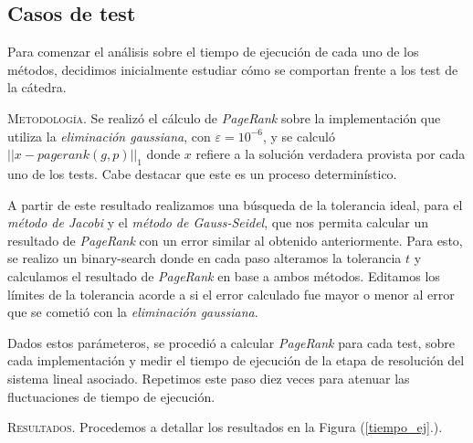 \subsection{Casos de test}

Para comenzar el análisis sobre el tiempo de ejecución de cada uno de los métodos, decidimos inicialmente estudiar cómo se comportan frente a los test de la cátedra. %

\vspace{2em}
\noindent\textsc{Metodología}. Se realizó el cálculo de \textit{PageRank} sobre la implementación que utiliza la \textit{eliminación gaussiana}, con $\varepsilon = 10^{-6}$, y se calculó $||x - pagerank(g, p)||_1$ donde $x$ refiere a la solución verdadera provista por cada uno de los tests. Cabe destacar que este es un proceso determinístico. 

A partir de este resultado realizamos una búsqueda de la tolerancia ideal, para el \textit{método de Jacobi} y el \textit{método de Gauss-Seidel}, que nos permita calcular un resultado de \textit{PageRank} con un error similar al obtenido anteriormente. Para esto, se realizo un binary-search donde en cada paso alteramos la tolerancia $t$ y calculamos el resultado de \textit{PageRank} en base a ambos métodos. Editamos los límites de la tolerancia acorde a si el error calculado fue mayor o menor al error que se cometió con la \textit{eliminación gaussiana}. %


\vspace{1em}
Dados estos parámeteros, se procedió a calcular \textit{PageRank} para cada test, sobre cada implementación y medir el tiempo de ejecución de la etapa de resolución del sistema lineal asociado. Repetimos este paso diez veces para atenuar las fluctuaciones de tiempo de ejecución. 

\vspace{2em}
\noindent \textsc{Resultados}. Procedemos a detallar los resultados en la Figura (\ref{tiempo_ej}.). 


